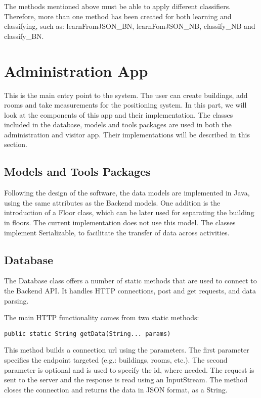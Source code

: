 \noindent
The methods mentioned above must be able to apply different classifiers. Therefore, more than one method has been created for both learning and classifying, such as: learnFromJSON\_BN, learnFomJSON\_NB, classify\_NB and classify\_BN. 


\section{Administration App}
This is the main entry point to the system. The user can create buildings, add rooms and take measurements for the positioning system. In this part, we will look at the components of this app and their implementation. The classes included in the database, models and tools packages are used in both the administration and visitor app. Their implementations will be described in this section.

\subsection{Models and Tools Packages}
Following the design of the software, the data models are implemented in Java, using the same attributes as the Backend models. One addition is the introduction of a Floor class, which can be later used for separating the building in floors. The current implementation does not use this model. The classes implement Serializable, to facilitate the transfer of data across activities. 
\subsection{Database}
The Database class offers a number of static methods that are used to connect to the Backend API. It handles HTTP connections, post and get requests, and data parsing.

\noindent
The main HTTP functionality comes from two static methods:

\begin{lstlisting}
public static String getData(String... params)
\end{lstlisting}
This method builds a connection url using the parameters. The first parameter specifies the endpoint targeted (e.g.: buildings, rooms, etc.). The second parameter is optional and is used to specify the id, where needed. The request is sent to the server and the response is read using an InputStream. The method closes the connection and returns the data in JSON format, as a String.

